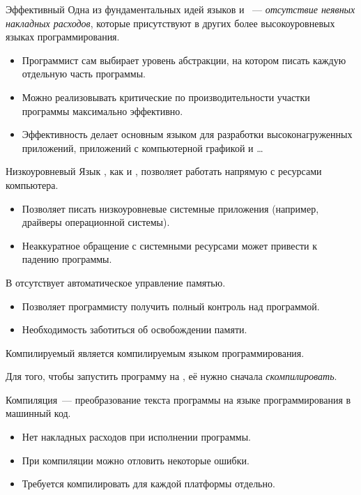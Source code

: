 \documentclass[aspectration=1610,t]{beamer}
\begin{document}
\begin{frame}{Эффективный}
    Одна из фундаментальных идей языков \langc и \langcpp~---
    {\em отсутствие неявных накладных расходов}, которые присутствуют
    в других более высокоуровневых языках программирования.
    \begin{itemize}
        \item Программист сам выбирает уровень абстракции, на котором писать
            каждую отдельную часть программы. 
        \item Можно реализовывать критические по производительности участки
        программы максимально эффективно.
        \item Эффективность делает \langcpp основным языком для разработки 
            высоконагруженных приложений, приложений с компьютерной графикой и \dots
    \end{itemize}

\end{frame}

\begin{frame}{Низкоуровневый}
    Язык \langcpp, как и \langc, позволяет работать напрямую 
    с ресурсами компьютера.
    \begin{itemize}
        \item Позволяет писать низкоуровневые системные приложения 
            (например, драйверы операционной системы).
        \item Неаккуратное обращение с системными ресурсами 
            может привести к падению программы.
    \end{itemize}

    В \langcpp отсутствует автоматическое управление памятью. 
    \begin{itemize}
        \item Позволяет программисту получить полный контроль над программой.
        \item Необходимость заботиться об освобождении памяти.
    \end{itemize}
\end{frame}

\begin{frame}{Компилируемый}
    \langcpp является компилируемым языком программирования.
    \medskip

    Для того, чтобы запустить программу на \langcpp, её нужно сначала {\em скомпилировать}.
    \medskip

    Компиляция~--- преобразование текста программы на языке программирования
    в машинный код.

    \begin{itemize}
        \item Нет накладных расходов при исполнении программы.
        \item При компиляции можно отловить некоторые ошибки.
        \item Требуется компилировать для каждой платформы отдельно.
    \end{itemize}

\end{frame}
\end{document}
